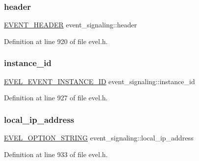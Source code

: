 \subsubsection{\texorpdfstring{header}{header}}
{\footnotesize\ttfamily \hyperlink{evel_8h_aa0ea94c675729365ea7825c4fc7e06d8}{E\+V\+E\+N\+T\+\_\+\+H\+E\+A\+D\+ER} event\+\_\+signaling\+::header}



Definition at line 920 of file evel.\+h.

\hypertarget{structevent__signaling_a27b94664bb47c81dd1364c5ec7d908ca}{}\label{structevent__signaling_a27b94664bb47c81dd1364c5ec7d908ca} 
\subsubsection{\texorpdfstring{instance\+\_\+id}{instance\_id}}
{\footnotesize\ttfamily \hyperlink{evel_8h_a4569c7e4bcb933caf47237a323d7c872}{E\+V\+E\+L\+\_\+\+E\+V\+E\+N\+T\+\_\+\+I\+N\+S\+T\+A\+N\+C\+E\+\_\+\+ID} event\+\_\+signaling\+::instance\+\_\+id}



Definition at line 927 of file evel.\+h.

\hypertarget{structevent__signaling_a2d73638b925f684967ecc34786e4ef7d}{}\label{structevent__signaling_a2d73638b925f684967ecc34786e4ef7d} 
\subsubsection{\texorpdfstring{local\+\_\+ip\+\_\+address}{local\_ip\_address}}
{\footnotesize\ttfamily \hyperlink{evel_8h_a0de5113a7b72de93c0c7b644f7ea7ec3}{E\+V\+E\+L\+\_\+\+O\+P\+T\+I\+O\+N\+\_\+\+S\+T\+R\+I\+NG} event\+\_\+signaling\+::local\+\_\+ip\+\_\+address}



Definition at line 933 of file evel.\+h.

\hypertarget{structevent__signaling_af51af033e7d7e598456ca984d2529ce2}{}\label{structevent__signaling_af51af033e7d7e598456ca984d2529ce2} 
